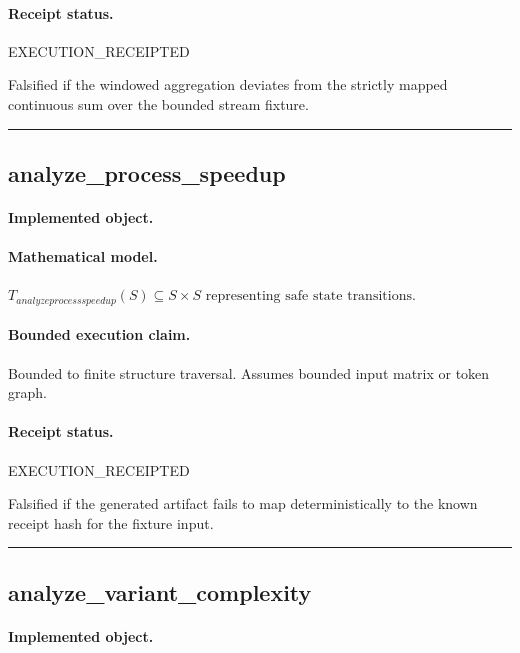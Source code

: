 \paragraph{Receipt status.} EXECUTION\_RECEIPTED
\begin{falsifier}
Falsified if the windowed aggregation deviates from the strictly mapped continuous sum over the bounded stream fixture.
\end{falsifier}

\vspace{1em}\hrule\vspace{1em}
\subsection{analyze\_process\_speedup}
\paragraph{Implemented object.} 
\paragraph{Mathematical model.} $T_{analyzeprocessspeedup}(S) \subseteq S \times S \text{ representing safe state transitions}.$
\paragraph{Bounded execution claim.} Bounded to finite structure traversal. Assumes bounded input matrix or token graph.
\paragraph{Receipt status.} EXECUTION\_RECEIPTED
\begin{falsifier}
Falsified if the generated artifact fails to map deterministically to the known receipt hash for the fixture input.
\end{falsifier}

\vspace{1em}\hrule\vspace{1em}
\subsection{analyze\_variant\_complexity}
\paragraph{Implemented object.} 

